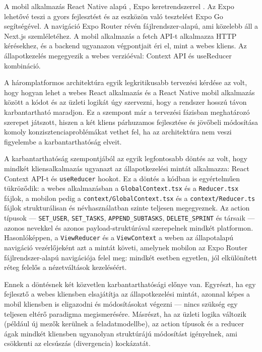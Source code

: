 
A mobil alkalmazás React Native alapú \cite{reactnative}, Expo keretrendszerrel \cite{expo}. Az Expo lehetővé teszi a gyors fejlesztést és az eszközön való tesztelést Expo Go segítségével. A navigáció Expo Router révén \cite{exporouter} fájlrendszer-alapú, ami közelebb áll a Next.js szemléletéhez. A mobil alkalmazás a fetch API-t alkalmazza HTTP kérésekhez, és a backend ugyanazon végpontjait éri el, mint a webes kliens. Az állapotkezelés megegyezik a webes verzióéval: Context API és useReducer kombináció.


A háromplatformos architektúra egyik legkritikusabb tervezési kérdése az volt,
hogy hogyan lehet a webes React alkalmazás és a React Native mobil alkalmazás
között a kódot és az üzleti logikát úgy szervezni, hogy a rendszer hosszú távon
karbantartható maradjon. Ez a szempont már a tervezési fázisban meghatározó
szerepet játszott, hiszen a két kliens párhuzamos fejlesztése és jövőbeli
módosítása komoly konzisztenciaproblémákat vethet fel, ha az architektúra nem
veszi figyelembe a karbantarthatóság elveit.


A karbantarthatóság szempontjából az egyik legfontosabb döntés az volt, hogy
mindkét kliensalkalmazás ugyanazt az állapotkezelési mintát alkalmazza: React
Context API-t és \texttt{useReducer} hookot. Ez a döntés a kódban is egyértelműen
tükröződik: a webes alkalmazásban a \texttt{GlobalContext.tsx} és a
\texttt{Reducer.tsx} fájlok, a mobilon pedig a \texttt{context/GlobalContext.tsx}
és a \texttt{context/Reducer.ts} fájlok strukturálisan és névhasználatban szinte
teljesen megegyeznek. Az action típusok — \texttt{SET\_USER}, \texttt{SET\_TASKS},
\texttt{APPEND\_SUBTASKS}, \texttt{DELETE\_SPRINT} és társaik — azonos nevekkel és
azonos payload-struktúrával szerepelnek mindkét platformon. Hasonlóképpen, a
\texttt{ViewReducer} és a \texttt{ViewContext} a weben az állapotalapú navigáció
vezérlőjeként azt a mintát követi, amelynek mobilon az Expo Router
fájlrendszer-alapú navigációja felel meg: mindkét esetben egyetlen, jól
elkülönített réteg felelős a nézetváltások kezeléséért.

Ennek a döntésnek két közvetlen karbantarthatósági előnye van. Egyrészt, ha egy
fejlesztő a webes kliensben elsajátítja az állapotkezelési mintát, azonnal képes
a mobil kliensben is eligazodni és módosításokat végezni — nincs szükség egy
teljesen eltérő paradigma megismerésére. Másrészt, ha az üzleti logika változik
(például új mezők kerülnek a feladatmodellbe), az action típusok és a reducer
ágak mindkét kliensben ugyanolyan struktúrájú módosítást igényelnek, ami
csökkenti az elcsúszás (divergencia) kockázatát.

